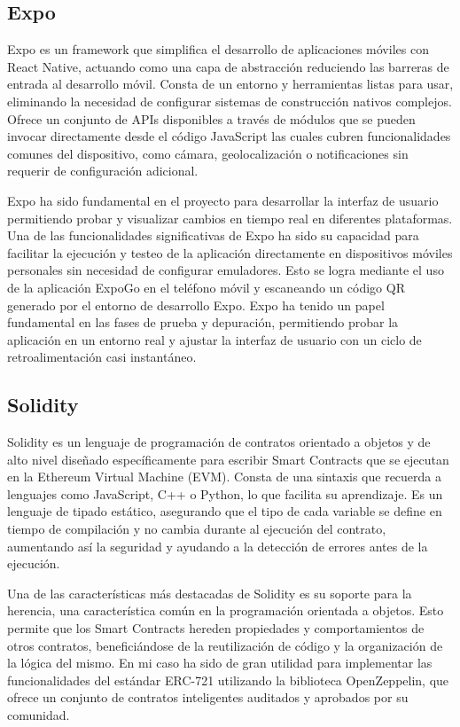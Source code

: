 \subsection{Expo}

Expo es un framework que simplifica el desarrollo de aplicaciones móviles con React Native, actuando como una capa de abstracción reduciendo las barreras de entrada al desarrollo móvil. 
Consta de un entorno y herramientas listas para usar, eliminando la necesidad de configurar sistemas de construcción nativos complejos. 
Ofrece un conjunto de APIs disponibles a través de módulos que se pueden invocar directamente desde el código JavaScript las cuales cubren funcionalidades comunes del dispositivo, como cámara, geolocalización o notificaciones sin requerir de configuración adicional. 

Expo ha sido fundamental en el proyecto para desarrollar la interfaz de usuario permitiendo probar y visualizar cambios en tiempo real en diferentes plataformas.
Una de las funcionalidades significativas de Expo ha sido su capacidad para facilitar la ejecución y testeo de la aplicación directamente en dispositivos móviles personales sin necesidad de configurar emuladores. Esto se logra mediante el uso de la aplicación ExpoGo en el teléfono móvil y escaneando un código QR generado por el entorno de desarrollo Expo.
Expo ha tenido un papel fundamental en las fases de prueba y depuración, permitiendo probar la aplicación en un entorno real y ajustar la interfaz de usuario con un ciclo de retroalimentación casi instantáneo.


\subsection{Solidity}

Solidity es un lenguaje de programación de contratos orientado a objetos y de alto nivel diseñado específicamente para escribir Smart Contracts que se ejecutan en la Ethereum Virtual Machine (EVM). Consta de una sintaxis que recuerda a lenguajes como JavaScript, C++ o Python, lo que facilita su aprendizaje. 
Es un lenguaje de tipado estático, asegurando que el tipo de cada variable se define en tiempo de compilación y no cambia durante al ejecución del contrato, aumentando así la seguridad y ayudando a la detección de errores antes de la ejecución.

Una de las características más destacadas de Solidity es su soporte para la herencia, una característica común en la programación orientada a objetos. Esto permite que los Smart Contracts hereden propiedades y comportamientos de otros contratos, beneficiándose de la reutilización de código y la organización de la lógica del mismo. En mi caso ha sido de gran utilidad para implementar las funcionalidades del estándar ERC-721 utilizando la biblioteca OpenZeppelin, que ofrece un conjunto de contratos inteligentes auditados y aprobados por su comunidad.

